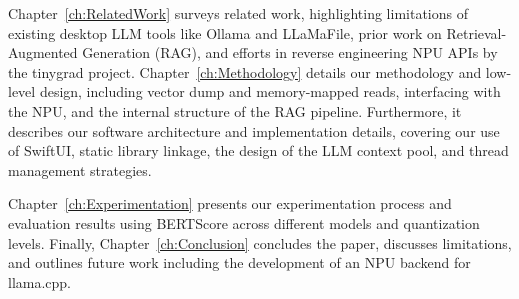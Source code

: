 Chapter~\ref{ch:RelatedWork} surveys related work, highlighting limitations of existing desktop LLM tools like Ollama and LLaMaFile, prior work on Retrieval-Augmented Generation (RAG), and efforts in reverse engineering NPU APIs by the tinygrad project. Chapter~\ref{ch:Methodology} details our methodology and low-level design, including vector dump and memory-mapped reads, interfacing with the NPU, and the internal structure of the RAG pipeline. Furthermore, it describes our software architecture and implementation details, covering our use of SwiftUI, static library linkage, the design of the LLM context pool, and thread management strategies. 

Chapter~\ref{ch:Experimentation} presents our experimentation process and evaluation results using BERTScore across different models and quantization levels. Finally, Chapter~\ref{ch:Conclusion} concludes the paper, discusses limitations, and outlines future work including the development of an NPU backend for llama.cpp.